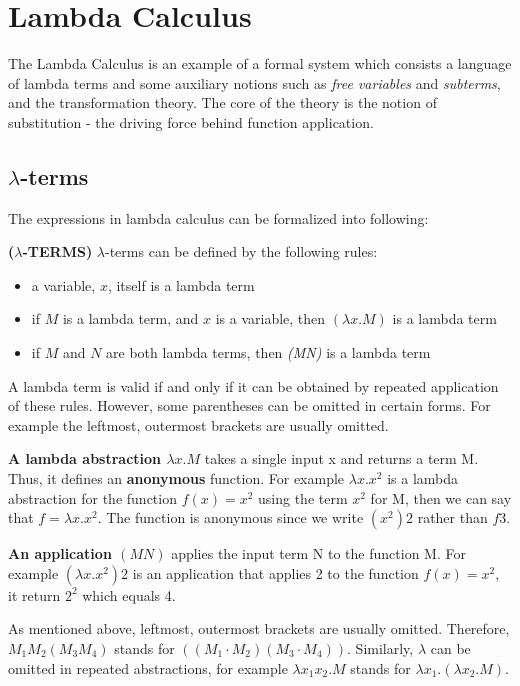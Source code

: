 \chapter{Lambda Calculus}

The Lambda Calculus is an example of a formal system which consists a language of lambda terms and some auxiliary notions such as \textit{free variables} and \textit{subterms}, and the transformation theory. The core of the theory is the notion of substitution - the driving force behind function application. 


\section{$\lambda$-terms}

\noindent The expressions in lambda calculus can be formalized into following: 


\begin{def1}
\normalfont \textbf{($\lambda$-TERMS)} $\lambda$-terms can be defined by the following rules:
\end{def1}

\begin{itemize}
\item a variable, $x$, itself is a lambda term
\item if $M$ is a lambda term, and $x$ is a variable, then $(\lambda x.M)$ is a lambda term
\item if $M$ and $N$ are both lambda terms, then \textit{(MN)} is a lambda term
\end{itemize}
A lambda term is valid if and only if it can be obtained by repeated application of these rules. However, some parentheses can be omitted in certain forms. For example the leftmost, outermost brackets are usually omitted.

\textbf{A lambda abstraction $\lambda x.M$} takes a single input x and returns a term M. Thus, it defines an \textbf{anonymous} function. For example $\lambda x.x^2$ is a lambda abstraction for the function $f(x) = x^2$ using the term $x^2$ for M, then we can say that $f = \lambda x.x^2$. The function is anonymous since we write $(x^2)2$ rather than $f3$.

\textbf{An application $(MN)$} applies the input term N to the function M. For example $(\lambda x.x^2)2$ is an application that applies 2 to the function $f(x) = x^2$, it return $2^2$ which equals 4.

As mentioned above, leftmost, outermost brackets are usually omitted. Therefore, $M_1M_2(M_3M_4)$ stands for $((M_1\cdot M_2)(M_3\cdot M_4))$. Similarly, $\lambda$ can be omitted in repeated abstractions, for example $\lambda x_1x_2.M$ stands for $\lambda x_1.(\lambda x_2.M)$.

